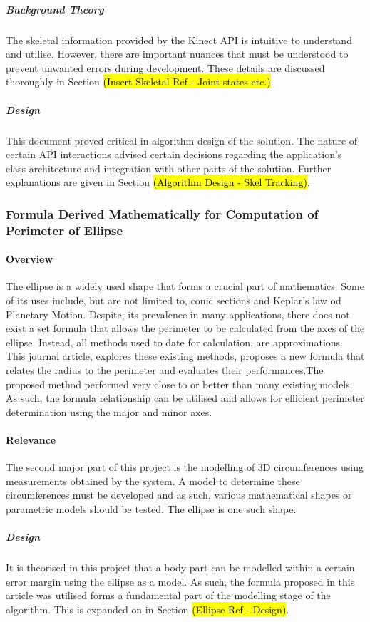 \subparagraph{Background Theory}
The skeletal information provided by the Kinect API is intuitive to understand and utilise. However, there are important nuances that must be understood to prevent unwanted errors during development. These details are discussed thoroughly in Section \hl{(Insert Skeletal Ref - Joint states etc.)}. 

\subparagraph{Design}
This document proved critical in algorithm design of the solution. The nature of certain API interactions advised certain decisions regarding the application's class architecture and integration with other parts of the solution. Further explanations are given in Section \hl{(Algorithm Design - Skel Tracking)}. 

\subsubsection{Formula Derived Mathematically for Computation of Perimeter of Ellipse \cite{ellipsePerimeter2012}}

\paragraph{Overview}
The ellipse is a widely used shape that forms a crucial part of mathematics. Some of its uses include, but are not limited to, conic sections and Keplar's law od Planetary Motion. Despite, its prevalence in many applications, there does not exist a set formula that allows the perimeter to be calculated from the axes of the ellipse. Instead, all methods used to date for calculation, are approximations. This journal article, explores these existing methods, proposes a new formula that relates the radius to the perimeter and evaluates their performances.The proposed method performed very close to or better than many existing models. As such, the formula relationship can be utilised and allows for efficient perimeter determination using the major and minor axes.

\paragraph{Relevance}
The second major part of this project is the modelling of 3D circumferences using measurements obtained by the system. A model to determine these circumferences must be developed and as such, various mathematical shapes or parametric models should be tested. The ellipse is one such shape. 

\subparagraph{Design}
It is theorised in this project that a body part can be modelled within a certain error margin using the ellipse as a model. As such, the formula proposed in this article was utilised forms a fundamental part of the modelling stage of the algorithm. This is expanded on in Section \hl{(Ellipse Ref - Design)}.

